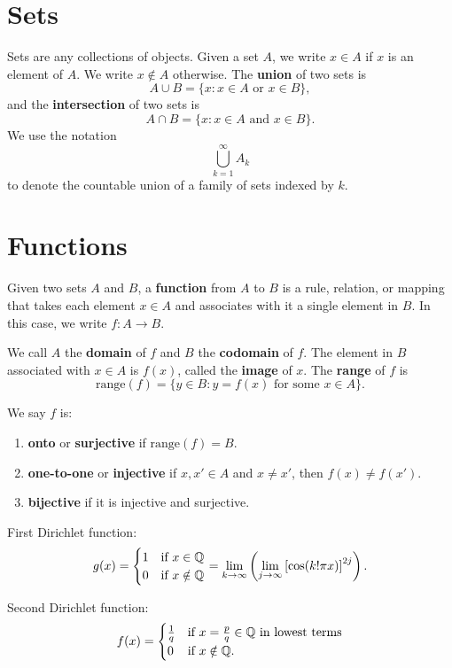 \section{Sets}
Sets are any collections of objects. Given a set $A$,
we write $x \in A$ if $x$ is an element of $A$. We write
$x \notin A$ otherwise. The \textbf{union} of two sets is
\[
  A \cup B = \{x : x \in A \text{ or } x \in B\}
,\]
and the \textbf{intersection} of two sets is
\[
  A \cap B = \{x : x \in A \text{ and } x \in B\}
.\]
We use the notation
\[\bigcup_{k = 1}^{\infty} A_k\]
to denote the countable union of a family of sets
indexed by $k$.

\section{Functions}
\begin{definition}
  Given two sets $A$ and $B$, a \textbf{function}
  from $A$ to $B$ is a rule, relation, or mapping that
  takes each element $x \in A$ and associates with
  it a single element in $B$. In this case,
  we write $f : A \to B$.
\end{definition}

We call $A$ the \textbf{domain} of $f$ and $B$ the
\textbf{codomain} of $f$. The element in $B$ associated
with $x \in A$ is $f(x)$, called the \textbf{image}
of $x$. The \textbf{range} of $f$ is
\[\text{range}(f) = \{y \in B : y = f(x) \text{ for some }x \in A\}.\]

We say $f$ is:
\begin{enumerate}
  \item \textbf{onto} or \textbf{surjective} if
    $\text{range}(f) = B$.
  \item \textbf{one-to-one} or \textbf{injective} if
    $x, x' \in A$ and $x \ne x'$, then $f(x) \ne f(x')$.
  \item \textbf{bijective} if it is injective and
    surjective.
\end{enumerate}

\begin{example}
  First Dirichlet function:
  \[
  g(x) =
  \begin{cases}
    1 & \text{if $x \in \mathbb{Q}$} \\
    0 & \text{if $x \notin \mathbb{Q}$}
  \end{cases}
  =
  \lim_{k \to \infty} \left(\lim_{j \to \infty} \left[\cos(k! \pi x)\right]^{2j}\right)
  .\]
\end{example}

\begin{example}
  Second Dirichlet function:
  \[
  f(x) =
  \begin{cases}
    \frac{1}{q} & \text{if $x = \frac{p}{q} \in \mathbb{Q}$ in lowest terms} \\
    0 & \text{if $x \notin \mathbb{Q}$}.
  \end{cases}
  \]
\end{example}

